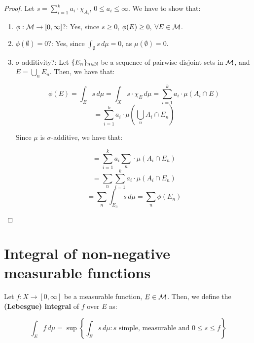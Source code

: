 \begin{proof}
    Let $s = \sum_{i=1}^k a_i \cdot \chi_{A_i}$, $0 \leq a_i \leq \infty$. We have to show that:

    \begin{enumerate}
        \item $\phi: \mathcal{M} \to [0, \infty]$?: Yes, since $s \geq 0$, $\phi(E) \geq 0, \; \forall E \in \mathcal{M}$.
        
        \item $\phi(\emptyset) = 0$?: Yes, since $\int_{\emptyset} s \, d\mu = 0$, as $\mu(\emptyset) = 0$.
        
        \item $\sigma$-additivity?: Let $\{E_n\}_{n \in \mathbb{N}}$ be a sequence of pairwise disjoint sets in $\mathcal{M}$, 
        and $E = \bigcup_{n} E_n$. Then, we have that:

        $$\phi(E) = \int_{E} s \, d\mu = \int_{X} s \cdot \chi_E \, d\mu = \sum_{i=1}^k a_i \cdot \mu(A_i \cap E)$$
        $$= \sum_{i=1}^k a_i \cdot \mu\left(\bigcup_{n} A_i \cap E_n\right)$$

        Since $\mu$ is $\sigma$-additive, we have that:

        $$= \sum_{i=1}^k a_i \sum_{n}  \cdot \mu(A_i \cap E_n)$$
        $$= \sum_{n} \sum_{i=1}^k a_i \cdot \mu(A_i \cap E_n)$$
        $$= \sum_{n} \int_{E_n} s \, d\mu = \sum_{n} \phi(E_n)$$
    \end{enumerate}

\end{proof}

\section{Integral of non-negative measurable functions}

\begin{fdefinition}
    Let $f: X \to [0, \infty]$ be a measurable function, $E \in \mathcal{M}$. Then, we define the 
    \textbf{(Lebesgue) integral} of $f$ over $E$ as:

    $$\int_{E} f \, d\mu = \sup\left\{\int_{E} s \, d\mu: s \text{ simple, measurable and } 0 \leq s \leq f\right\}$$
\end{fdefinition}

